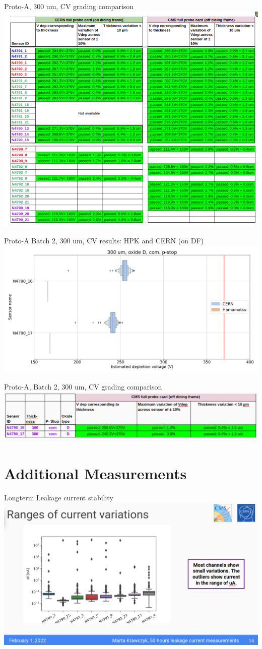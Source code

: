 \documentclass{beamer}
\begin{document}
\begin{frame}{Proto-A, 300 um, CV grading comparison}
  \includegraphics[width=.7\textwidth]{plots/CV_grading_300um.png}
\end{frame}

\begin{frame}{Proto-A Batch 2, 300 um, CV results: HPK and CERN (on DF)}
  \includegraphics[width=.8\textwidth]{plots/CV_ComparisonHPK_300um.png}
\end{frame}

\begin{frame}{Proto-A, Batch 2, 300 um, CV grading comparison}
  \includegraphics[width=.7\textwidth]{plots/CV_grading_300um_2.png}
\end{frame}



\section{Additional Measurements}

\begin{frame}{Longterm Leakage current stability}
  \includegraphics[width=.7\textwidth]{plots/Longterm_ranges.png}
\end{frame}
\end{document}
